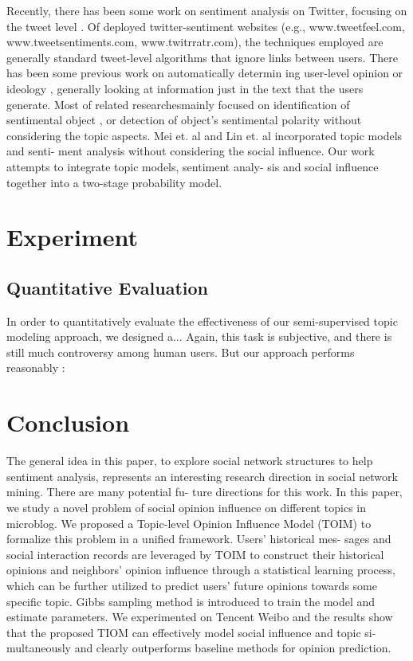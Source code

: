 \documentclass[runningheads,a4paper]{llncs}
\begin{document}
Recently, there has been some work on sentiment analysis
on Twitter, focusing on the tweet level \cite{barbosa2010robust,davidov2010enhanced,jiang2011target,li2010micro,tan2011user}. Of deployed twitter-sentiment websites (e.g., www.tweetfeel.com, www.tweetsentiments.com, www.twitrratr.com), the techniques employed are generally standard tweet-level algorithms that ignore links between users. There has been some previous work on automatically determin
ing user-level opinion or ideology \cite{agrawal2003mining,mostafa2013more,malouf2008taking,yu2008classifying}, generally looking at information just in the text that the users generate. 
Most of related researchesmainly focused on identification of sentimental object \cite{liu2010comment}, or detection of object’s sentimental polarity \cite{zhai2011constrained} without considering the topic aspects. Mei et. al \cite{mei2007topic} and Lin et. al \cite{lin2009joint} incorporated topic models and senti- ment analysis without considering the social influence. Our work attempts to integrate topic models, sentiment analy- sis and social influence together into a two-stage probability model.


\section{Experiment}

\subsection{Quantitative Evaluation}
In order to quantitatively evaluate the effectiveness of our semi-supervised topic modeling approach, we designed a...
Again, this task is subjective, and there is still much controversy among human users. But our approach performs reasonably :
\section{Conclusion}
The general idea in this paper, to explore social network structures to help sentiment analysis, represents an interesting research direction in social network mining. There are many potential fu- ture directions for this work.
In this paper, we study a novel problem of social opinion
influence on different topics in microblog. We proposed a Topic-level Opinion Influence Model (TOIM) to formalize this problem in a unified framework. Users’ historical mes- sages and social interaction records are leveraged by TOIM to construct their historical opinions and neighbors’ opinion influence through a statistical learning process, which can be further utilized to predict users’ future opinions towards some specific topic. Gibbs sampling method is introduced to train the model and estimate parameters. We experimented on Tencent Weibo and the results show that the proposed TIOM can effectively model social influence and topic si- multaneously and clearly outperforms baseline methods for opinion prediction.
\end{document}
